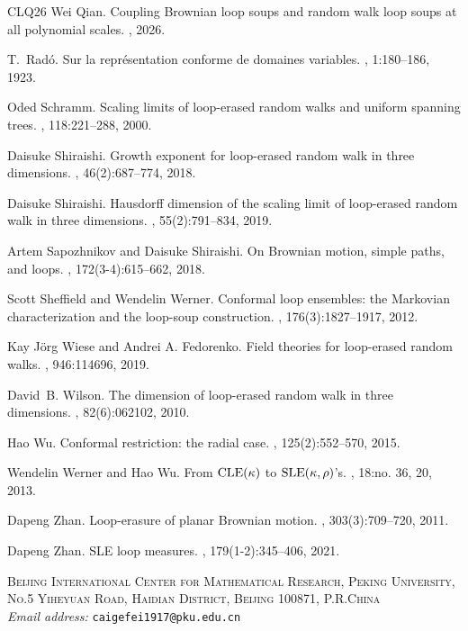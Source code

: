 \documentclass[11pt]{article}
\numberwithin{equation}{section}
\newcommand{\1}{\mathbf{1}}
\begin{document}
{\begin{thebibliography}{CLQ{\etalchar{+}}26}
Wei Qian.
\newblock Coupling {Brownian} loop soups and random walk loop soups at all
  polynomial scales.
, 2026.

T.~Radó.
\newblock Sur la représentation conforme de domaines variables.
, 1:180--186, 1923.

Oded Schramm.
\newblock Scaling limits of loop-erased random walks and uniform spanning
  trees.
, 118:221--288, 2000.

Daisuke Shiraishi.
\newblock Growth exponent for loop-erased random walk in three dimensions.
, 46(2):687--774, 2018.

Daisuke Shiraishi.
\newblock Hausdorff dimension of the scaling limit of loop-erased random walk
  in three dimensions.
,
  55(2):791--834, 2019.

Artem Sapozhnikov and Daisuke Shiraishi.
\newblock On {B}rownian motion, simple paths, and loops.
, 172(3-4):615--662, 2018.

Scott Sheffield and Wendelin Werner.
\newblock Conformal loop ensembles: the {M}arkovian characterization and the
  loop-soup construction.
, 176(3):1827--1917, 2012.

Kay J{\"o}rg Wiese and Andrei A. Fedorenko.
\newblock Field theories for loop-erased random walks.
, 946:114696, 2019.

David~B. Wilson.
\newblock The dimension of loop-erased random walk in three dimensions.
, 82(6):062102, 2010.

Hao Wu.
\newblock Conformal restriction: the radial case.
, 125(2):552--570, 2015.

Wendelin Werner and Hao Wu.
\newblock From {${\rm CLE}(\kappa)$} to {${\rm SLE}(\kappa,\rho)$}'s.
, 18:no. 36, 20, 2013.

Dapeng Zhan.
\newblock Loop-erasure of planar {B}rownian motion.
, 303(3):709--720, 2011.

Dapeng Zhan.
\newblock S{LE} loop measures.
, 179(1-2):345--406, 2021.

\end{thebibliography}
}

\bigskip

\noindent
\textsc{Beijing International Center for Mathematical Research, Peking University,\\
No.5 Yiheyuan Road, Haidian District, Beijing 100871, P.R.China}\\
\textit{Email address:} \texttt{caigefei1917@pku.edu.cn}
\end{document}
